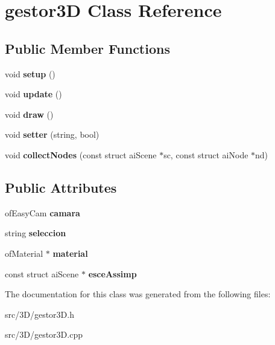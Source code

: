 \hypertarget{classgestor3_d}{}\section{gestor3\+D Class Reference}
\label{classgestor3_d}
\subsection*{Public Member Functions}
\begin{DoxyCompactItemize}
\item 
\hypertarget{classgestor3_d_a7e78509d749d8359b01e8ac4bad1b928}{}void {\bfseries setup} ()\label{classgestor3_d_a7e78509d749d8359b01e8ac4bad1b928}

\item 
\hypertarget{classgestor3_d_a5d52d4f7939438826b062b75f3e1b127}{}void {\bfseries update} ()\label{classgestor3_d_a5d52d4f7939438826b062b75f3e1b127}

\item 
\hypertarget{classgestor3_d_a2a80279e4ae233bb38454233438fccdf}{}void {\bfseries draw} ()\label{classgestor3_d_a2a80279e4ae233bb38454233438fccdf}

\item 
\hypertarget{classgestor3_d_a72c78fba47f22485ff0f31444be90e69}{}void {\bfseries setter} (string, bool)\label{classgestor3_d_a72c78fba47f22485ff0f31444be90e69}

\item 
\hypertarget{classgestor3_d_aa2e25034cd02e3d89d116dce04943c45}{}void {\bfseries collect\+Nodes} (const struct ai\+Scene $\ast$sc, const struct ai\+Node $\ast$nd)\label{classgestor3_d_aa2e25034cd02e3d89d116dce04943c45}

\end{DoxyCompactItemize}
\subsection*{Public Attributes}
\begin{DoxyCompactItemize}
\item 
\hypertarget{classgestor3_d_a6be5f52abeea86b96c1e4f3aea34c474}{}of\+Easy\+Cam {\bfseries camara}\label{classgestor3_d_a6be5f52abeea86b96c1e4f3aea34c474}

\item 
\hypertarget{classgestor3_d_a5a11588c7ebbadebb67a5ff91daa5fb0}{}string {\bfseries seleccion}\label{classgestor3_d_a5a11588c7ebbadebb67a5ff91daa5fb0}

\item 
\hypertarget{classgestor3_d_abc2fb794742d3ecb1a34b08140af43b2}{}of\+Material $\ast$ {\bfseries material}\label{classgestor3_d_abc2fb794742d3ecb1a34b08140af43b2}

\item 
\hypertarget{classgestor3_d_a027f970d4334e2dd4aca9cefadb33d23}{}const struct ai\+Scene $\ast$ {\bfseries esce\+Assimp}\label{classgestor3_d_a027f970d4334e2dd4aca9cefadb33d23}

\end{DoxyCompactItemize}


The documentation for this class was generated from the following files\+:\begin{DoxyCompactItemize}
\item 
src/3\+D/gestor3\+D.\+h\item 
src/3\+D/gestor3\+D.\+cpp\end{DoxyCompactItemize}
